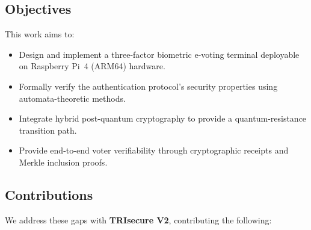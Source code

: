 \documentclass[preprint,12pt]{elsarticle}
\begin{document}
\subsection{Objectives}

This work aims to:
\begin{itemize}
  \item Design and implement a three-factor biometric e-voting terminal
        deployable on Raspberry Pi~4 (ARM64) hardware.
  \item Formally verify the authentication protocol's security properties
        using automata-theoretic methods.
  \item Integrate hybrid post-quantum cryptography to provide a
        quantum-resistance transition path.
  \item Provide end-to-end voter verifiability through cryptographic
        receipts and Merkle inclusion proofs.
\end{itemize}

\subsection{Contributions}

We address these gaps with \textbf{TRIsecure V2}, contributing the
following:
\end{document}
